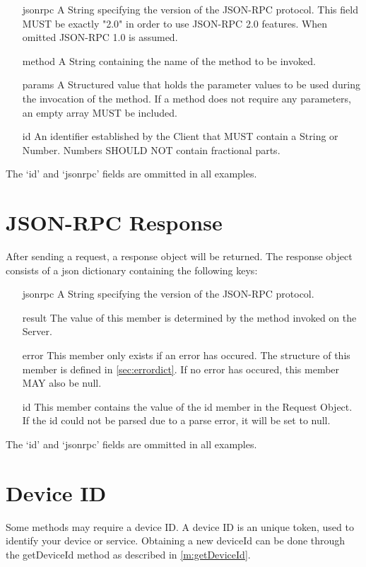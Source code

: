 \documentclass[a4paper]{scrreprt}
\begin{document}
\begin{enumerate}
\item[jsonrpc] A String specifying the version of the JSON-RPC protocol. This field MUST be exactly "2.0" in order to use JSON-RPC 2.0 features. When omitted JSON-RPC 1.0 is assumed.
\item[method]
A String containing the name of the method to be invoked.
\item[params]
A Structured value that holds the parameter values to be used during the invocation of the method. If a method does not require any parameters, an empty array MUST be included.
\item[id]
An identifier established by the Client that MUST contain a String or Number.  Numbers SHOULD NOT contain fractional parts.
\end{enumerate}
The `id' and `jsonrpc' fields are ommitted in all examples.

\clearpage

\section{JSON-RPC Response}
After sending a request, a response object will be returned. The response object consists of a json dictionary containing the following keys:
\begin{enumerate}
\item[jsonrpc]
A String specifying the version of the JSON-RPC protocol.
\item[result]
The value of this member is determined by the method invoked on the Server.
\item[error]
This member only exists if an error has occured. The structure of this member is defined in \autoref{sec:errordict}. If no error has occured, this member MAY also be null.
\item[id]
This member contains the value of the id member in the Request Object. If the id could not be parsed due to a parse error, it will be set to null. 
\end{enumerate}
The `id' and `jsonrpc' fields are ommitted in all examples.


\section{Device ID}
Some methods may require a device ID. A device ID is an unique token, used to identify your device or service. Obtaining a new deviceId can be done through the getDeviceId method as described in \autoref{m:getDeviceId}.
\end{document}
